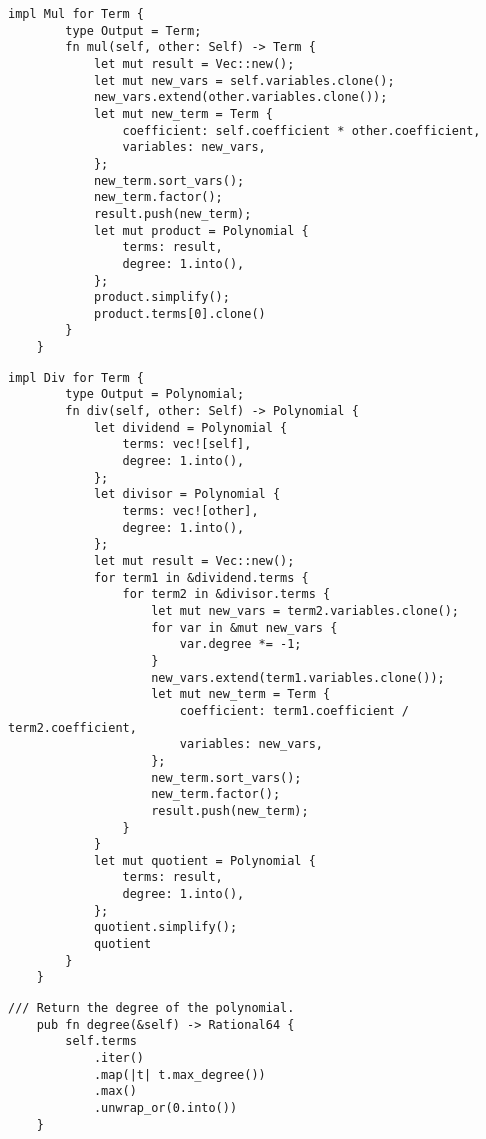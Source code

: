 \begin{lstlisting}[caption={The implementation of the multiplication operation for the \texttt{Term} struct}, label={lst:term-mul}]
    impl Mul for Term {
        type Output = Term;
        fn mul(self, other: Self) -> Term {
            let mut result = Vec::new();
            let mut new_vars = self.variables.clone();
            new_vars.extend(other.variables.clone());
            let mut new_term = Term {
                coefficient: self.coefficient * other.coefficient,
                variables: new_vars,
            };
            new_term.sort_vars();
            new_term.factor();
            result.push(new_term);
            let mut product = Polynomial {
                terms: result,
                degree: 1.into(),
            };
            product.simplify();
            product.terms[0].clone()
        }
    }
\end{lstlisting}

\begin{lstlisting}[caption={The implementation of the division operation for the \texttt{Term} struct}, label={lst:term-div}]
    impl Div for Term {
        type Output = Polynomial;
        fn div(self, other: Self) -> Polynomial {
            let dividend = Polynomial {
                terms: vec![self],
                degree: 1.into(),
            };
            let divisor = Polynomial {
                terms: vec![other],
                degree: 1.into(),
            };
            let mut result = Vec::new();
            for term1 in &dividend.terms {
                for term2 in &divisor.terms {
                    let mut new_vars = term2.variables.clone();
                    for var in &mut new_vars {
                        var.degree *= -1;
                    }
                    new_vars.extend(term1.variables.clone());
                    let mut new_term = Term {
                        coefficient: term1.coefficient / term2.coefficient,
                        variables: new_vars,
                    };
                    new_term.sort_vars();
                    new_term.factor();
                    result.push(new_term);
                }
            }
            let mut quotient = Polynomial {
                terms: result,
                degree: 1.into(),
            };
            quotient.simplify();
            quotient
        }
    }
\end{lstlisting}

\begin{lstlisting}[caption={The implementation of the \texttt{degree()} method for the \texttt{Polynomial} struct}, label={lst:polynomial-degree}]
    /// Return the degree of the polynomial.
    pub fn degree(&self) -> Rational64 {
        self.terms
            .iter()
            .map(|t| t.max_degree())
            .max()
            .unwrap_or(0.into())
    }
\end{lstlisting}

